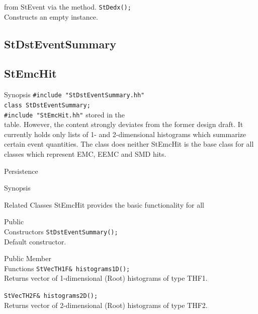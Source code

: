 \begin{Entry}
\end{Entry}
    from StEvent via the  method.
%
    \verb+StDedx();+ \\
    Constructs an empty instance.
\subsection{StDstEventSummary}
    
\begin{Entry}
\subsection{StEmcHit }  
    

\item[Synopsis]
    \verb+#include "StDstEventSummary.hh"+\\
    \verb+class StDstEventSummary;+\\

    \verb+#include "StEmcHit.hh"+
    stored in the\\  table. However,
    the content strongly deviates from the former design draft.
    It currently holds only lists of 1- and 2-dimensional histograms
    which summarize certain event quantities. The class does neither
    StEmcHit is the base class for all classes which represent EMC, EEMC and SMD hits.

\item[Persistence]
    
\item[Synopsis] 
\item[Related Classes]
    StEmcHit provides the basic functionality for all
    
\item[Public\\ Constructors]
    \verb+StDstEventSummary();+ \\
    Default constructor.

\item[Public Member\\ Functions]
    \verb+StVecTH1F& histograms1D();+ \\
    Returns vector of 1-dimensional (Root) histograms of type THF1.

    \verb+StVecTH2F& histograms2D();+ \\
    Returns vector of 2-dimensional (Root) histograms of type THF2.
\end{Entry}
    
